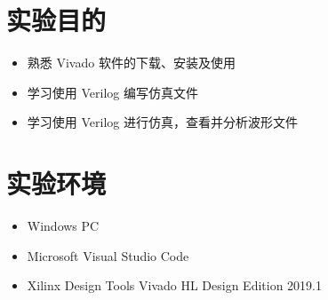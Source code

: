 \documentclass[UTF8,fontset=fandol]{ctexart}
\begin{document}
\section*{实验目的}
\begin{itemize}
    \item 熟悉 Vivado 软件的下载、安装及使用
    \item 学习使用 Verilog 编写仿真文件
    \item 学习使用 Verilog 进行仿真，查看并分析波形文件
\end{itemize}
\section*{实验环境}
\begin{itemize}
    \item Windows PC
    \item Microsoft Visual Studio Code
    \item Xilinx Design Tools Vivado HL Design Edition 2019.1 
\end{itemize}
\end{document}
